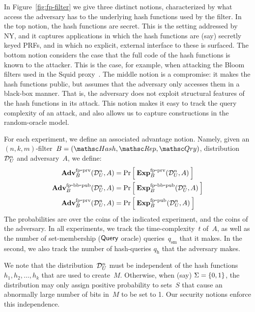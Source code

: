 In Figure~\ref{fig:fp-filter} we give three distinct notions,
characterized by what access the adversary has to the underlying
hash functions used by the filter.  In the top notion, the hash
functions are secret.  This is the setting addressed by NY, and it
captures applications in which the hash functions are (say) secretly
keyed PRFs, and in which no explicit, external interface to these is
surfaced.
%
The bottom notion considers the case that the full code of the hash functions is known to the attacker.  This is the case, for example, when attacking the Bloom filters used in the Squid proxy~\cite{xxx}.
%
The middle notion is a compromise: it makes the hash functions
public, but assumes that the adversary only accesses them in a
black-box manner.  That is, the adversary does not exploit
structural features of the hash functions in its attack.  This
notion makes it easy to track the query complexity of an attack, and
also allows us to capture constructions in the random-oracle model. 

For each experiment, we define an associated advantage
notion.  Namely, given an $(n,k,m)$-filter~$B=(\Hash,\Rep,\Qry)$,
distribution~$\mathcal{D}_{U}^{n}$ and adversary~$A$, we define:
\begin{align*}
\mathrm{\mathbf{Adv}}^{\mathrm{fp\mbox{-}prv}}_{B}(\mathcal{D}_{U}^{n},A) &= \Pr\left[\: \mathrm{\mathbf{Exp}}^{\mathrm{fp\mbox{-}prv}}_{B}(\mathcal{D}_{U}^{n},A) \:\right] \\
\mathrm{\mathbf{Adv}}^{\mathrm{fp\mbox{-}bb\mbox{-}pub}}_{B}(\mathcal{D}_{U}^{n},A) &= \Pr\left[\: \mathrm{\mathbf{Exp}}^{\mathrm{fp\mbox{-}bb\mbox{-}pub}}_{B}(\mathcal{D}_{U}^{n},A) \:\right] \\
\mathrm{\mathbf{Adv}}^{\mathrm{fp\mbox{-}prv}}_{B}(\mathcal{D}_{U}^{n},A) &= \Pr\left[\: \mathrm{\mathbf{Exp}}^{\mathrm{fp\mbox{-}pub}}_{B}(\mathcal{D}_{U}^{n},A) \:\right]
\end{align*}
The probabilities are over the coins of the indicated experiment,
and the coins of the adversary.   In all experiments, we track the
time-complexity~$t$ of~$A$, as well as the number of set-membership
($\mathsf{Query}$ oracle) queries~$q_{\mathrm{sm}}$ that it makes.   In
the second, we also track the number of hash-queries
$q_{\mathrm{h}}$ that the adversary makes.

We note that the distribution~$\mathcal{D}_{U}^{n}$ must be independent of the hash functions $h_1,h_2,\ldots,h_k$ that are used to create~$M$.  Otherwise, when (say) $\Sigma=\{0,1\}$, the distribution may only assign positive probability to sets~$S$ that cause an abnormally large number of bits in~$M$ to be set to 1.  Our security notions enforce this independence.

